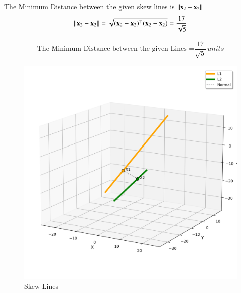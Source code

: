 \documentclass[journal]{IEEEtran}
\begin{document}
The Minimum Distance between the given skew lines is $\left\lVert\mathbf{x}_2 - \mathbf{x}_2\right\rVert$
\begin{equation}
    \left\lVert\mathbf{x}_2 - \mathbf{x}_2\right\rVert = \sqrt{(\mathbf{x}_2 - \mathbf{x}_2)^\top (\mathbf{x}_2 - \mathbf{x}_2)} = \dfrac{17}{\sqrt{5}}
\end{equation}

\begin{align}
    \boxed{\text{The Minimum Distance between the given Lines =} \dfrac{17}{\sqrt{5}} \, units}
\end{align}



\begin{figure}[htbp]
    \centering
    \includegraphics[width=\columnwidth]{figs/fig1.png}
    \caption{Skew Lines}
    \label{fig:fig/fig1.png}
\end{figure}
\end{document}
